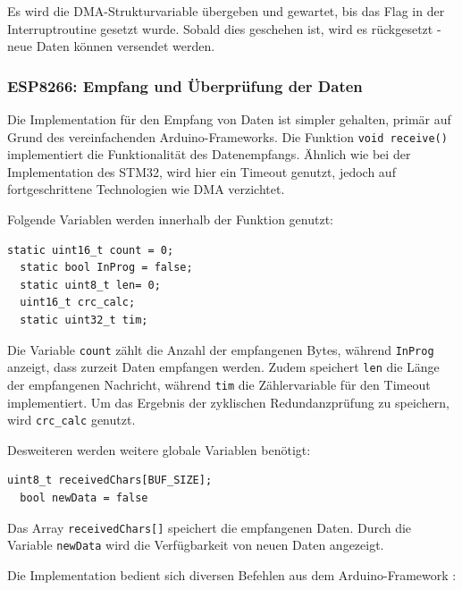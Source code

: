 Es wird die DMA-Strukturvariable übergeben und gewartet, bis das Flag in der Interruptroutine gesetzt wurde. Sobald dies geschehen ist, wird es rückgesetzt - neue
Daten können versendet werden.




\subsubsection{ESP8266: Empfang und Überprüfung der Daten}

Die Implementation für den Empfang von Daten ist simpler gehalten, primär auf Grund des vereinfachenden Arduino-Frameworks. Die Funktion \lstinline!void receive()!
implementiert die Funktionalität des Datenempfangs. Ähnlich wie bei der Implementation des STM32, wird hier ein Timeout genutzt, jedoch auf fortgeschrittene 
Technologien wie \ac{DMA} verzichtet.

\smallskip

Folgende Variablen werden innerhalb der Funktion genutzt:

\begin{lstlisting}[caption={\textit{Variablen receive()}}]
  static uint16_t count = 0;
  static bool InProg = false;
  static uint8_t len= 0;
  uint16_t crc_calc;
  static uint32_t tim;  
\end{lstlisting}

Die Variable \lstinline!count! zählt die Anzahl der empfangenen Bytes, während \lstinline!InProg! anzeigt, dass zurzeit Daten empfangen werden. Zudem speichert
\lstinline!len! die Länge der empfangenen Nachricht, während \lstinline!tim! die Zählervariable für den Timeout implementiert. Um das Ergebnis der zyklischen
Redundanzprüfung zu speichern, wird \lstinline!crc_calc! genutzt.

\smallskip

Desweiteren werden weitere globale Variablen benötigt:

\begin{lstlisting}[caption={\textit{Globale Variablen receive()}}]
  uint8_t receivedChars[BUF_SIZE];   
  bool newData = false
\end{lstlisting}

Das Array \lstinline!receivedChars[]! speichert die empfangenen Daten. Durch die Variable \lstinline!newData! wird die Verfügbarkeit von neuen Daten angezeigt.

\smallskip

Die Implementation bedient sich diversen Befehlen aus dem Arduino-Framework \citep{ArduinoRef}:

